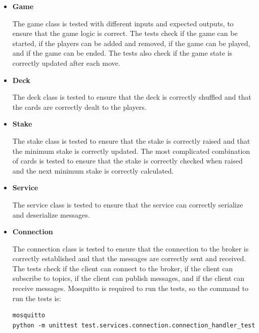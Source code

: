 \documentclass{scrartcl}
\begin{document}
\begin{itemize}
      \item \textbf{Game}\par
            The game class is tested with different inputs and expected outputs, to ensure that the 
            game logic is correct. The tests check if the game can be started, if the players can be 
            added and removed, if the game can be played, and if the game can be ended. The tests also 
            check if the game state is correctly updated after each move.
      \item \textbf{Deck}\par
            The deck class is tested to ensure that the deck is correctly shuffled and that the cards 
            are correctly dealt to the players.
      \item \textbf{Stake}\par
            The stake class is tested to ensure that the stake is correctly raised and that the 
            minimum stake is correctly updated. The most complicated combination of cards is tested 
            to ensure that the stake is correctly checked when raised and the next minimum stake is 
            correctly calculated.
      \item \textbf{Service}\par
            The service class is tested to ensure that the service can correctly serialize and 
            deserialize messages.
      \item \textbf{Connection}\par
            The connection class is tested to ensure that the connection to the broker is correctly 
            established and that the messages are correctly sent and received. The tests check if the 
            client can connect to the broker, if the client can subscribe to topics, if the client can 
            publish messages, and if the client can receive messages.
            Mosquitto is required to run the tests, so the command to run the tests is:
            \begin{verbatim}
mosquitto
python -m unittest test.services.connection.connection_handler_test
            \end{verbatim}

\end{itemize}
\end{document}
